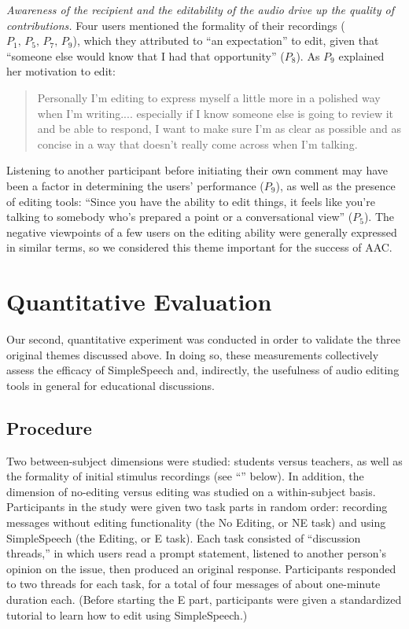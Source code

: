 \emph{Awareness of the recipient and the editability of the audio drive up the quality of contributions.}
Four users mentioned the formality of their recordings ($P_1,\,P_5,\,P_7,\,P_9$), which they attributed to ``an expectation'' to edit, given that ``someone else would know that I had that opportunity'' ($P_8$).
As $P_9$ explained her motivation to edit:
\begin{quote}
	Personally I'm editing to express myself a little more in a polished way when I'm writing.... especially if I know someone else is going to review it and be able to respond, I want to make sure I'm as clear as possible and as concise in a way that doesn't really come across when I'm talking.
\end{quote}
Listening to another participant before initiating their own comment may have been a factor in determining the users' performance ($P_9$), as well as the presence of editing tools: ``Since you have the ability to edit things, it feels like you're talking to somebody who's prepared a point or a conversational view'' ($P_5$). 
The negative viewpoints of a few users on the editing ability were generally expressed in similar terms, so we considered this theme important for the success of AAC.

\section{Quantitative Evaluation}
Our second, quantitative experiment was conducted in order to validate the three original themes discussed above.
In doing so, these measurements collectively assess the efficacy of SimpleSpeech and, indirectly, the usefulness of audio editing tools in general for educational discussions.

\subsection{Procedure}
Two between-subject dimensions were studied: students versus teachers, as well as the formality of initial stimulus recordings (see ``'' below).
In addition, the dimension of no-editing versus editing was studied on a within-subject basis.
Participants in the study were given two task parts in random order: recording messages without editing functionality (the No Editing, or NE task) and using SimpleSpeech (the Editing, or E task). 
Each task consisted of ``discussion threads,'' in which users read a prompt statement, listened to another person's opinion on the issue, then produced an original response.
Participants responded to two threads for each task, for a total of four messages of about one-minute duration each.
(Before starting the E part, participants were given a standardized tutorial to learn how to edit using SimpleSpeech.)

